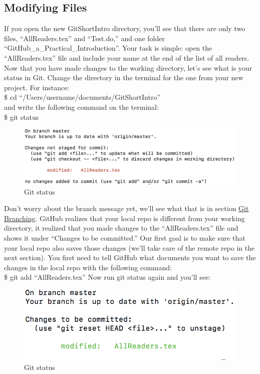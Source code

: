 \documentclass{article}
\begin{document}
    \subsection{Modifying Files}
    If you open the new GitShortIntro directory, you'll see that there are only two files, ``AllReaders.tex'' and ``Test.do,'' and one folder ``GitHub\_a\_Practical\_Introduction''. Your task is simple: open the ``AllReaders.tex'' file and include your name at the end of the list of all readers. \\
    \newline
    Now that you have made changes to the working directory, let's see what is your status in Git. Change the directory in the terminal for the one from your new project. For instance: \\
    \newline
    \indent \$ cd ``/Users/username/documents/GitShortIntro'' \\
    \newline
    and write the following command on the terminal: \\
    \newline
    \indent \$ git status \\
    \begin{figure}[H]
	\caption{Git status}
	\includegraphics[scale=0.5]{images/figure2.png}
	\centering
    \end{figure}
    Don't worry about the branch message yet, we'll see what that is in section \hyperref[sec:branching]{Git Branching}. GitHub realizes that your local repo is different from your working directory, it realized that you made changes to the ``AllReaders.tex'' file and shows it under ``Changes to be committed.'' Our first goal is to make sure that your local repo also saves those changes (we'll take care of the remote repo in the next section). You first need to tell GitHub what documents you want to save the changes in the local repo with the following command: \\
    \newline
    \indent \$ git add ``AllReaders.tex''
    \newline
    \newline
    Now run git status again and you'll see:
    \newline
    \begin{figure}[h]
	\caption{Git status}
	\includegraphics[scale=0.5]{images/figure3.png}
	\centering
    \end{figure}
\end{document}
